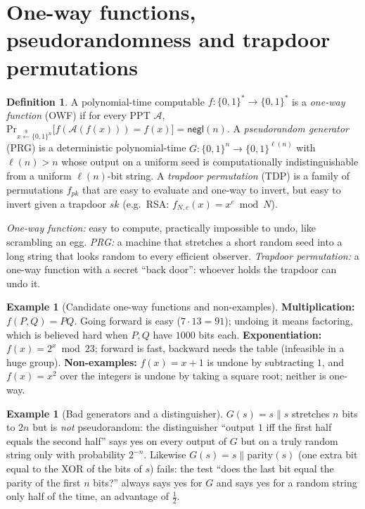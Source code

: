 \documentclass[11pt,a4paper]{report}
\theoremstyle{plain}
\theoremstyle{definition}
\newtheorem{definition}[theorem]{Definition}
\newtheorem{example}[theorem]{Example}
\theoremstyle{remark}
\newcommand{\getsr}{\xleftarrow{\$}}
\newcommand{\negl}{\mathsf{negl}}
\renewcommand{\Pr}{\mathrm{Pr}}
\begin{document}
\section{One-way functions, pseudorandomness and trapdoor permutations}
\begin{definition}
A polynomial-time computable $f:\{0,1\}^*\to\{0,1\}^*$ is a \emph{one-way function} (OWF) if for every PPT $\mathcal A$, $\Pr_{x\getsr\{0,1\}^n}\big[f(\mathcal A(f(x)))=f(x)\big]=\negl(n)$. A \emph{pseudorandom generator} (PRG) is a deterministic polynomial-time $G:\{0,1\}^n\to\{0,1\}^{\ell(n)}$ with $\ell(n)>n$ whose output on a uniform seed is computationally indistinguishable from a uniform $\ell(n)$-bit string. A \emph{trapdoor permutation} (TDP) is a family of permutations $f_{pk}$ that are easy to evaluate and one-way to invert, but easy to invert given a trapdoor $sk$ (e.g.\ RSA: $f_{N,e}(x)=x^e\bmod N$).
\end{definition}
\begin{plain}\PE
\emph{One-way function:} easy to compute, practically impossible to undo, like scrambling an egg. \emph{PRG:} a machine that stretches a short random seed into a long string that looks random to every efficient observer. \emph{Trapdoor permutation:} a one-way function with a secret ``back door'': whoever holds the trapdoor can undo it.
\end{plain}
\begin{example}[Candidate one-way functions and non-examples]
\textbf{Multiplication:} $f(P,Q)=PQ$. Going forward is easy ($7\cdot13=91$); undoing it means factoring, which is believed hard when $P,Q$ have $1000$ bits each. \textbf{Exponentiation:} $f(x)=2^x\bmod23$; forward is fast, backward needs the table (infeasible in a huge group).
\textbf{Non-examples:} $f(x)=x+1$ is undone by subtracting $1$, and $f(x)=x^2$ over the integers is undone by taking a square root; neither is one-way.
\end{example}
\begin{example}[Bad generators and a distinguisher]
$G(s)=s\|s$ stretches $n$ bits to $2n$ but is \emph{not} pseudorandom: the distinguisher ``output $1$ iff the first half equals the second half'' says yes on every output of $G$ but on a truly random string only with probability $2^{-n}$. Likewise $G(s)=s\|\mathrm{parity}(s)$ (one extra bit equal to the XOR of the bits of $s$) fails: the test ``does the last bit equal the parity of the first $n$ bits?'' always says yes for $G$ and says yes for a random string only half of the time, an advantage of $\tfrac12$.
\end{example}
\end{document}
